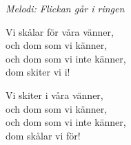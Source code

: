 {\footnotesize\textit{Melodi: Flickan går i ringen}}\par
\vspace{10pt}
Vi skålar för våra vänner,\\
och dom som vi känner,\\
och dom som vi inte känner,\\
dom skiter vi i!\par
\vspace{10pt}
Vi skiter i våra vänner,\\
och dom som vi känner,\\
och dom som vi inte känner,\\
dom skålar vi för!
